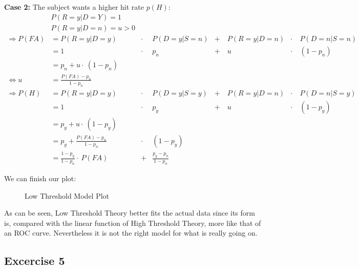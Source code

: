 \documentclass[../main/Notes.tex]{subfiles}
\begin{document}
\textbf{Case 2:} The subject wants a higher hit rate $p(H)$:
\begin{align*}
& P\left(R=y|D=Y\right) = 1 \\
& P\left(R=y|D=n\right) = u > 0\\
\Rightarrow P(FA) & = P\left(R=y|D=y\right) &\cdot~& P\left(D=y|S=n\right) &+~&P\left(R=y|D=n\right)&\cdot~ & P\left(D=n|S=n\right) \\
& = 1 &\cdot~& p_{n} &+~& u &\cdot~& \left(1-p_{n}\right) \\
& = p_{n} + u \cdot~ \left(1-p_{n}\right)\\
\Leftrightarrow u &= \frac{P(FA)-p_{n}}{1-p_{n}} \\
\Rightarrow P(H) & = P\left(R=y|D=y\right) &\cdot~& P\left(D=y|S=y\right) &+~&P\left(R=y|D=n\right)&\cdot~ & P\left(D=n|S=y\right) \\
& = 1 &\cdot~& p_{y} &+~& u &\cdot~& \left(1-p_{y}\right) \\
& = p_{y} +  u \cdot~ \left(1-p_{y}\right)\\
& = p_{y} +  \frac{P(FA)-p_{n}}{1-p_{n}} & \cdot~ &  \left( 1-p_{y} \right)\\
& = \frac{1-p_{y}}{1-p_{n}} \cdot~ P(FA) & + & \frac{p_{y}-p_{n}}{1-p_{n}}
\end{align*}

We can finish our plot:
\begin{figure}[ht!]
  \centering
  \caption{Low Threshold Model Plot}
  \label{fig:2014-06-27_LowThrshPlot}
\end{figure}

As can be seen, Low Threshold Theory better fits the actual data since its form is, compared with the linear function of High Threshold Theory, more like that of an ROC curve. Nevertheless it is not the right model for what is really going on.

\subsection*{Excercise 5}\label{sheet6ex5}
\end{document}
